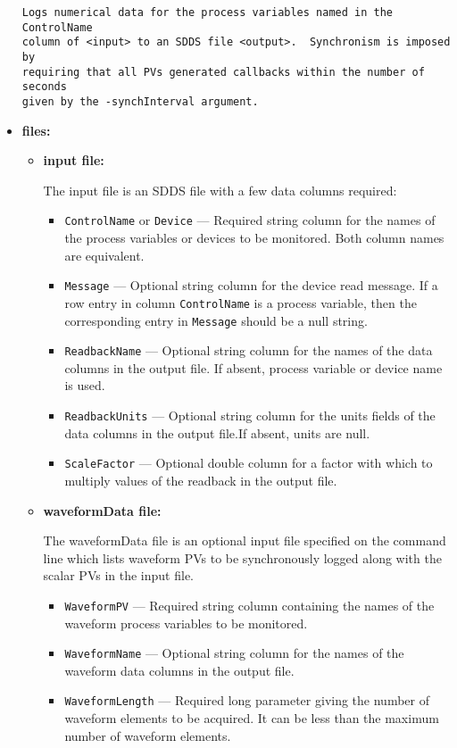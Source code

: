 \begin{itemize}
\begin{verbatim}
Logs numerical data for the process variables named in the ControlName
column of <input> to an SDDS file <output>.  Synchronism is imposed by
requiring that all PVs generated callbacks within the number of seconds
given by the -synchInterval argument.
\end{verbatim}
\item {\bf files:}
\begin{itemize}
\item {\bf input file:}\par
The input file is an SDDS file with a few data columns required:
\begin{itemize}
        \item {\tt ControlName} or {\tt Device} --- Required string column for the names of the process variables
                or devices to be monitored. Both column names are equivalent.
        \item {\tt Message} --- Optional string column for the device read message. If a row entry in
                column {\tt ControlName} is a process variable, then the corresponding entry
                in {\tt Message} should be a null string. 
        \item {\tt ReadbackName} --- Optional string column for the names of the data columns in the 
                output file. If absent, process variable or device name is used.
        \item {\tt ReadbackUnits} --- Optional string column for the units fields of the data columns in the 
                output file.If absent, units are null.
        \item {\tt ScaleFactor} --- Optional double column for a factor with which to multiply
                values of the readback in the output file.
\end{itemize}

\item {\bf waveformData file:} \par The waveformData file is an
optional input file specified on the command line which lists waveform
PVs to be synchronously logged along with the scalar PVs in the input
file.
\begin{itemize}
        \item {\tt WaveformPV} --- Required string column containing the names of the waveform
                process variables to be monitored.
        \item {\tt WaveformName} --- Optional string column for the names of the waveform data
                columns in the output file.
        \item {\tt WaveformLength} --- Required long parameter giving the number of waveform elements 
                to be acquired.  It can be less than the maximum number of waveform elements.
\end{itemize}


\end{itemize}
\end{itemize}
